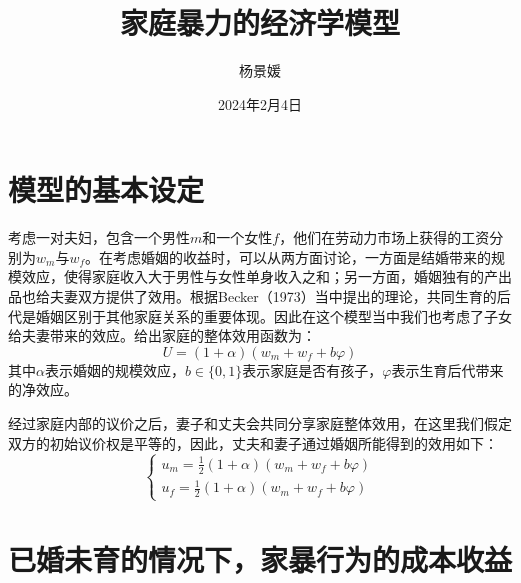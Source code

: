 \documentclass[a4paper,zihao=-4,UTF8]{ctexart}
\begin{document}
	\title{家庭暴力的经济学模型}
	\author{杨景媛}
	\date{2024年2月4日} 
	\maketitle



	\section*{模型的基本设定}	
	考虑一对夫妇，包含一个男性$m$和一个女性$f$，他们在劳动力市场上获得的工资分别为$w_m$与$w_f$。在考虑婚姻的收益时，可以从两方面讨论，一方面是结婚带来的规模效应，使得家庭收入大于男性与女性单身收入之和；另一方面，婚姻独有的产出品也给夫妻双方提供了效用。根据Becker（1973）当中提出的理论，共同生育的后代是婚姻区别于其他家庭关系的重要体现。因此在这个模型当中我们也考虑了子女给夫妻带来的效应。给出家庭的整体效用函数为：
	\begin{equation}
		U = (1+\alpha)(w_m+w_f+b\varphi)
	\end{equation}
	其中$\alpha$表示婚姻的规模效应，$b \in \{0,1\}$表示家庭是否有孩子，$\varphi$表示生育后代带来的净效应。
	
	经过家庭内部的议价之后，妻子和丈夫会共同分享家庭整体效用，在这里我们假定双方的初始议价权是平等的，因此，丈夫和妻子通过婚姻所能得到的效用如下：
	\begin{equation}
		\left\{
		\begin{array}{lr}
			u_m = \frac{1}{2}(1+\alpha)(w_m+w_f+b\varphi) \\
			u_f =  \frac{1}{2}(1+\alpha)(w_m+w_f+b\varphi)
		\end{array}
		\right.
	\end{equation}
	
	
	\section*{已婚未育的情况下，家暴行为的成本收益}
	
\end{document}
